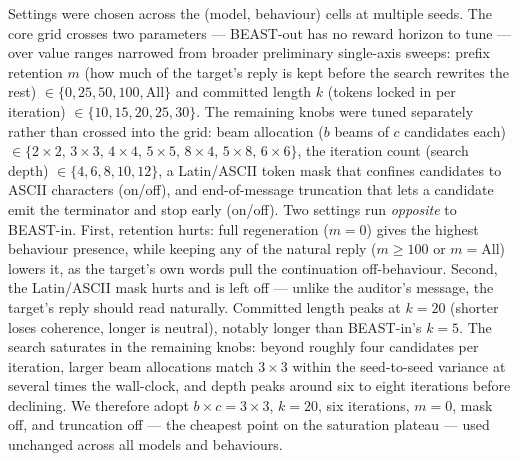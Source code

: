 \documentclass{article}
\theoremstyle{plain}
\theoremstyle{definition}
\theoremstyle{remark}
\begin{document}
Settings were chosen across the (model, behaviour) cells at multiple seeds. The core grid crosses two parameters --- BEAST-out has no reward horizon to tune --- over value ranges narrowed from broader preliminary single-axis sweeps: prefix retention $m$ (how much of the target's reply is kept before the search rewrites the rest) $\in \{0, 25, 50, 100, \text{All}\}$ and committed length $k$ (tokens locked in per iteration) $\in \{10, 15, 20, 25, 30\}$. The remaining knobs were tuned separately rather than crossed into the grid: beam allocation ($b$ beams of $c$ candidates each) $\in \{2\times2,\,3\times3,\,4\times4,\,5\times5,\,8\times4,\,5\times8,\,6\times6\}$, the iteration count (search depth) $\in \{4, 6, 8, 10, 12\}$, a Latin/ASCII token mask that confines candidates to ASCII characters (on/off), and end-of-message truncation that lets a candidate emit the terminator and stop early (on/off). Two settings run \emph{opposite} to BEAST-in. First, retention hurts: full regeneration ($m = 0$) gives the highest behaviour presence, while keeping any of the natural reply ($m \ge 100$ or $m = \text{All}$) lowers it, as the target's own words pull the continuation off-behaviour. Second, the Latin/ASCII mask hurts and is left off --- unlike the auditor's message, the target's reply should read naturally. Committed length peaks at $k = 20$ (shorter loses coherence, longer is neutral), notably longer than BEAST-in's $k = 5$. The search saturates in the remaining knobs: beyond roughly four candidates per iteration, larger beam allocations match $3 \times 3$ within the seed-to-seed variance at several times the wall-clock, and depth peaks around six to eight iterations before declining. We therefore adopt $b \times c = 3 \times 3$, $k = 20$, six iterations, $m = 0$, mask off, and truncation off --- the cheapest point on the saturation plateau --- used unchanged across all models and behaviours.
\end{document}
